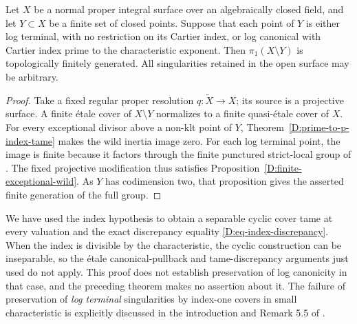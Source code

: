 \begin{corollary}
\label{D:prime-to-p-index-boundary}
Let $X$ be a normal proper integral surface over an
algebraically closed field, and let $Y\subset X$ be a
finite set of closed points.  Suppose that each point
of $Y$ is either log terminal, with no restriction on
its Cartier index, or log canonical with Cartier
index prime to the characteristic exponent.
Then $\pi_1(X\setminus Y)$ is topologically finitely
generated.  All singularities retained in the open
surface may be arbitrary.
\end{corollary}
\begin{proof}
Take a fixed regular proper resolution
$q:\widetilde X\to X$; its source is a projective
surface.  A finite \'etale cover of $X\setminus Y$
normalizes to a finite quasi-\'etale cover of $X$.
For every exceptional divisor above a non-klt point
of $Y$, Theorem~\ref{D:prime-to-p-index-tame} makes
the wild inertia image zero.  For each log terminal
point, the image is finite because it factors
through the finite punctured strict-local group
of \cite[Theorem 5.3, p.~739]{CarvajalRojasYasuda2025B}.
The fixed projective modification thus satisfies
Proposition~\ref{D:finite-exceptional-wild}.
As $Y$ has codimension two, that proposition gives
the asserted finite generation of the full group.
\end{proof}

\begin{remark}
We have used the index hypothesis to obtain a separable
cyclic cover tame at every valuation and the exact
discrepancy equality \eqref{D:eq-index-discrepancy}.
When the index is divisible by the characteristic,
the cyclic construction can be inseparable, so the
\'etale canonical-pullback and tame-discrepancy
arguments just used do not apply.  This proof does
not establish preservation of log canonicity in
that case, and the preceding theorem makes no
assertion about it.  The failure of preservation
of \emph{log terminal} singularities by index-one
covers in small characteristic is explicitly
discussed in the introduction and Remark 5.5 of
\cite{CarvajalRojasYasuda2025B}.
\end{remark}
